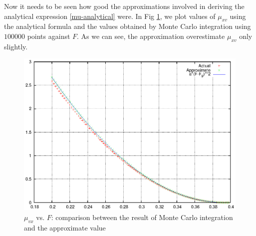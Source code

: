 \documentclass[oneside]{book}
\renewcommand{\(}{\begin{columns}}
\renewcommand{\)}{\end{columns}}
\newcommand{\<}[1]{\begin{column}{#1}}
\renewcommand{\>}{\end{column}}
\begin{document}
Now it needs to be seen how good the approximations involved in deriving the 
analytical expression \eqref{mu-analytical} were.  In Fig 
\ref{fig-mu-actual-approx}, we plot values of $\mu_{xv}$ using the analytical formula and the values 
obtained by Monte Carlo integration using $100000$ points against $F$.  As we 
can see, the approximation overestimate $\mu_{xv}$ only slightly.  

\begin{figure}[!htb]
\caption{$\mu_{vx}$ vs.  $F$: comparison between the result of Monte Carlo integration
and the approximate value}
\label{fig-mu-actual-approx}
\begin{center}
\includegraphics[width=0.75\columnwidth]{vxarea-actual-approx}
\end{center}
\end{figure}



%
%
%
%
%
\end{document}
